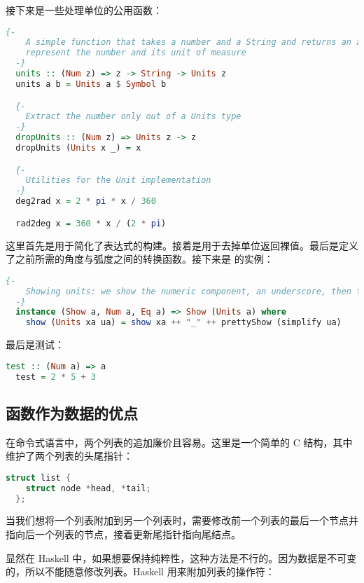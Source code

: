 \documentclass[./main.tex]{subfiles}
\begin{document}
接下来是一些处理单位的公用函数：

\begin{lstlisting}[language=Haskell]
  {-
    A simple function that takes a number and a String and returns an appropriate Units type to
    represent the number and its unit of measure
  -}
  units :: (Num z) => z -> String -> Units z
  units a b = Units a $ Symbol b

  {-
    Extract the number only out of a Units type
  -}
  dropUnits :: (Num z) => Units z -> z
  dropUnits (Units x _) = x

  {-
    Utilities for the Unit implementation
  -}
  deg2rad x = 2 * pi * x / 360

  rad2deg x = 360 * x / (2 * pi)
\end{lstlisting}

这里首先是用于简化了表达式的构建。接着是用于去掉单位返回裸值。最后是定义了之前所需的角度与弧度之间的转换函数。接下来是
的实例：

\begin{lstlisting}[language=Haskell]
  {-
    Showing units: we show the numeric component, an underscore, then the prettyShow version of the simplified units
  -}
  instance (Show a, Num a, Eq a) => Show (Units a) where
    show (Units xa ua) = show xa ++ "_" ++ prettyShow (simplify ua)
\end{lstlisting}

最后是测试：

\begin{lstlisting}[language=Haskell]
  test :: (Num a) => a
  test = 2 * 5 + 3
\end{lstlisting}

\subsection*{函数作为数据的优点}

在命令式语言中，两个列表的追加廉价且容易。这里是一个简单的 C 结构，其中维护了两个列表的头尾指针：

\begin{lstlisting}[language=C]
  struct list {
    struct node *head, *tail;
  };
\end{lstlisting}

当我们想将一个列表附加到另一个列表时，需要修改前一个列表的最后一个节点并指向后一个列表的节点，接着更新尾指针指向尾结点。

显然在 Haskell 中，如果想要保持纯粹性，这种方法是不行的。因为数据是不可变的，所以不能随意修改列表。Haskell 用来附加列表的\acode{(++)}操作符：
\end{document}
